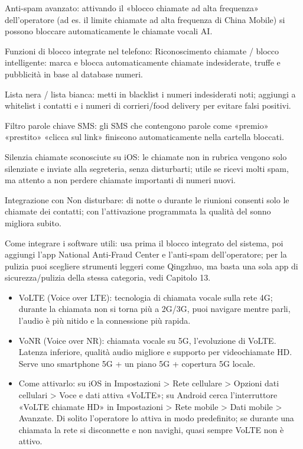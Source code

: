 Anti-spam avanzato: attivando il «blocco chiamate ad alta frequenza» dell'operatore (ad es. il limite chiamate ad alta frequenza di China Mobile) si possono bloccare automaticamente le chiamate vocali AI.

Funzioni di blocco integrate nel telefono: Riconoscimento chiamate / blocco intelligente: marca e blocca automaticamente chiamate indesiderate, truffe e pubblicità in base al database numeri.

Lista nera / lista bianca: metti in blacklist i numeri indesiderati noti; aggiungi a whitelist i contatti e i numeri di corrieri/food delivery per evitare falsi positivi.

Filtro parole chiave SMS: gli SMS che contengono parole come «premio» «prestito» «clicca sul link» finiscono automaticamente nella cartella bloccati.

Silenzia chiamate sconosciute su iOS: le chiamate non in rubrica vengono solo silenziate e inviate alla segreteria, senza disturbarti; utile se ricevi molti spam, ma attento a non perdere chiamate importanti di numeri nuovi.

Integrazione con Non disturbare: di notte o durante le riunioni consenti solo le chiamate dei contatti; con l'attivazione programmata la qualità del sonno migliora subito.

Come integrare i software utili: usa prima il blocco integrato del sistema, poi aggiungi l'app National Anti-Fraud Center e l'anti-spam dell'operatore; per la pulizia puoi scegliere strumenti leggeri come Qingzhuo, ma basta una sola app di sicurezza/pulizia della stessa categoria, vedi Capitolo 13.


\begin{itemize}
  \item VoLTE (Voice over LTE): tecnologia di chiamata vocale sulla rete 4G; durante la chiamata non si torna più a 2G/3G, puoi navigare mentre parli, l'audio è più nitido e la connessione più rapida.
  \item VoNR (Voice over NR): chiamata vocale su 5G, l'evoluzione di VoLTE. Latenza inferiore, qualità audio migliore e supporto per videochiamate HD. Serve uno smartphone 5G + un piano 5G + copertura 5G locale.
  \item Come attivarlo: su iOS in Impostazioni > Rete cellulare > Opzioni dati cellulari > Voce e dati attiva «VoLTE»; su Android cerca l'interruttore «VoLTE chiamate HD» in Impostazioni > Rete mobile > Dati mobile > Avanzate. Di solito l'operatore lo attiva in modo predefinito; se durante una chiamata la rete si disconnette e non navighi, quasi sempre VoLTE non è attivo.
\end{itemize}

